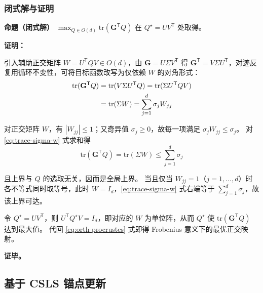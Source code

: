 \documentclass[withoutpreface]{cumcmthesis}
\begin{document}
\subsubsection{闭式解与证明}
\textbf{命题（闭式解）} $\displaystyle\max_{Q\in O(d)}\mathrm{tr}(\mathbf{G}^{\mathsf{T}}Q)$ 在 $Q^\star=UV^{\mathsf{T}}$ 处取得。

\textbf{证明： }

引入辅助正交矩阵 $W=U^{\mathsf{T}}QV\in O(d)$，由 $\mathbf{G}=U\Sigma V^{\mathsf{T}}$ 得 $\mathbf{G}^{\mathsf{T}}=V\Sigma U^{\mathsf{T}}$，对迹反复用循环不变性，可将目标函数改写为仅依赖 $W$ 的对角形式：
\begin{align}
  \mathrm{tr}(\mathbf{G}^{\mathsf{T}}Q)
  &= \mathrm{tr}(V\Sigma U^{\mathsf{T}}Q)
   = \mathrm{tr}(\Sigma U^{\mathsf{T}}QV) \notag\\
  &= \mathrm{tr}(\Sigma W)
   = \sum_{j=1}^{d} \sigma_j W_{jj}
  \label{eq:trace-sigma-w}
\end{align}

对正交矩阵 $W$，有 $|W_{jj}|\le 1$；又奇异值 $\sigma_j\ge 0$，故每一项满足 $\sigma_j W_{jj}\le \sigma_j$。
对 \eqref{eq:trace-sigma-w} 式求和得
\begin{equation}
  \mathrm{tr}(\mathbf{G}^{\mathsf{T}}Q)=\mathrm{tr}(\Sigma W)\le\sum_{j=1}^{d}\sigma_j
\end{equation}

且上界与 $Q$ 的选取无关，因而是全局上界。
当且仅当 $W_{jj}=1$（$j=1,\ldots,d$）时各不等式同时取等号，此时 $W=I_d$，\eqref{eq:trace-sigma-w} 
式右端等于 $\sum_{j=1}^{d}\sigma_j$，故该上界可达。

令 $Q^\star=UV^{\mathsf{T}}$，则 $U^{\mathsf{T}}Q^\star V=I_d$，即对应的 $W$ 为单位阵，从而 $Q^\star$ 使 $\mathrm{tr}(\mathbf{G}^{\mathsf{T}}Q)$ 达到最大值。
代回 \eqref{eq:orth-procrustes} 式即得 Frobenius 意义下的最优正交映射。

\textbf{证毕。}

\subsection{基于 CSLS 锚点更新}
\end{document}
